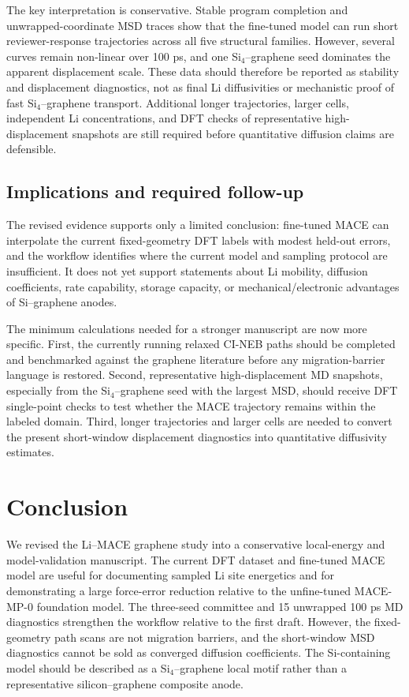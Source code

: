 \documentclass[12pt]{article}
\begin{document}
The key interpretation is conservative. Stable program completion and unwrapped-coordinate MSD traces show that the fine-tuned model can run short reviewer-response trajectories across all five structural families. However, several curves remain non-linear over 100 ps, and one Si$_4$--graphene seed dominates the apparent displacement scale. These data should therefore be reported as stability and displacement diagnostics, not as final Li diffusivities or mechanistic proof of fast Si$_4$--graphene transport. Additional longer trajectories, larger cells, independent Li concentrations, and DFT checks of representative high-displacement snapshots are still required before quantitative diffusion claims are defensible.

\subsection{Implications and required follow-up}

The revised evidence supports only a limited conclusion: fine-tuned MACE can interpolate the current fixed-geometry DFT labels with modest held-out errors, and the workflow identifies where the current model and sampling protocol are insufficient. It does not yet support statements about Li mobility, diffusion coefficients, rate capability, storage capacity, or mechanical/electronic advantages of Si--graphene anodes.

The minimum calculations needed for a stronger manuscript are now more specific. First, the currently running relaxed CI-NEB paths should be completed and benchmarked against the graphene literature before any migration-barrier language is restored. Second, representative high-displacement MD snapshots, especially from the Si$_4$--graphene seed with the largest MSD, should receive DFT single-point checks to test whether the MACE trajectory remains within the labeled domain. Third, longer trajectories and larger cells are needed to convert the present short-window displacement diagnostics into quantitative diffusivity estimates.

\section{Conclusion}

We revised the Li--MACE graphene study into a conservative local-energy and model-validation manuscript. The current DFT dataset and fine-tuned MACE model are useful for documenting sampled Li site energetics and for demonstrating a large force-error reduction relative to the unfine-tuned MACE-MP-0 foundation model. The three-seed committee and 15 unwrapped 100 ps MD diagnostics strengthen the workflow relative to the first draft. However, the fixed-geometry path scans are not migration barriers, and the short-window MSD diagnostics cannot be sold as converged diffusion coefficients. The Si-containing model should be described as a Si$_4$--graphene local motif rather than a representative silicon--graphene composite anode.
\end{document}

